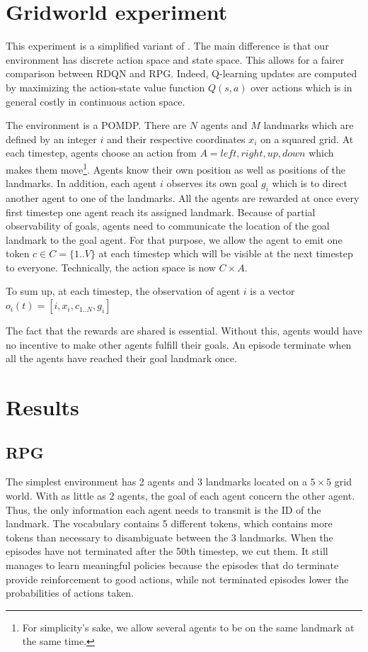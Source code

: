 \documentclass{article} %
\begin{document}
\section{Gridworld experiment}
This experiment is a simplified variant of \cite{mordatch2017emergence}. The main difference is that our environment has discrete action space and state space. This allows for a fairer comparison between RDQN and RPG. Indeed, Q-learning updates are computed by maximizing the action-state value function $Q(s,a)$ over actions which is in general costly in continuous action space. 

The environment is a POMDP. There are $N$ agents and $M$ landmarks which are defined by an integer $i$ and their respective coordinates $x_i$ on a squared grid. At each timestep, agents choose an action from $A={left, right, up, down}$ which makes them move\footnote{For simplicity's sake, we allow several agents to be on the same landmark at the same time.}. Agents know their own position as well as positions of the landmarks. In addition, each agent $i$ observes its own goal $g_i$ which is to direct another agent to one of the landmarks. All the agents are rewarded at once every first timestep one agent reach its assigned landmark. Because of partial observability of goals, agents need to communicate the location of the goal landmark to the goal agent. For that purpose, we allow the agent to emit one token $c \in C = \{1..V\}$ at each timestep which will be visible at the next timestep to everyone. Technically, the action space is now $C \times A$.

To sum up, at each timestep, the observation of agent $i$ is a vector $o_i(t) = [i, x_i, c_{1..N}, g_i]$

The fact that the rewards are shared is essential. Without this, agents would have no incentive to make other agents fulfill their goals. An episode terminate when all the agents have reached their goal landmark once.

\section{Results}
\subsection{RPG}
The simplest environment has 2 agents and 3 landmarks located on a $5 \times 5$ grid world. With as little as 2 agents, the goal of each agent concern the other agent. Thus, the only information each agent needs to transmit is the ID of the landmark. The vocabulary contains 5 different tokens, which contains more tokens than necessary to disambiguate between the 3 landmarks. When the episodes have not terminated after the 50th timestep, we cut them. It still manages to learn meaningful policies because the episodes that do terminate provide reinforcement to good actions, while not terminated episodes lower the probabilities of actions taken. 
\end{document}
